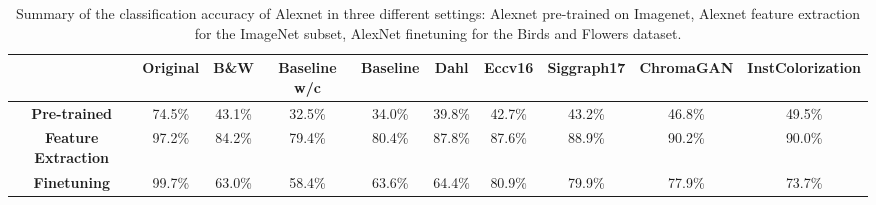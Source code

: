 \documentclass[10pt,twocolumn,letterpaper]{article}
\begin{document}
\begin{table}[ht]
	\begin{center}
		\begin{adjustwidth}{-1.3cm}{}
			\begin{tabular}{c|ccccccccc}
				&\textbf{Original} & \textbf{B\&W} & \textbf{Baseline w/c}&\textbf{Baseline} & \textbf{Dahl} & \textbf{Eccv16} & \textbf{Siggraph17} & \textbf{ChromaGAN} & \textbf{InstColorization}  \\
				\midrule
				\textbf{Pre-trained} & 74.5\% & 43.1\% & 32.5\% & 34.0\% & 39.8\% & 42.7\% & 43.2\% & 46.8\% & 49.5\% \\
				\midrule
				\textbf{Feature Extraction} & 97.2\% & 84.2\% & 79.4\% & 80.4\% & 87.8\% & 87.6\% &  88.9\%   &  90.2\% &       90.0\% \\
				\midrule
				\textbf{Finetuning} & 99.7\% & 63.0\% & 58.4\% & 63.6\% & 64.4\% & 80.9\% &  79.9\%   &  77.9\% &       73.7\% \\
			\end{tabular}
		\end{adjustwidth}
	\end{center}
	\caption{{\small  Summary of the classification accuracy of Alexnet in three different settings: Alexnet pre-trained on Imagenet, Alexnet feature extraction for the ImageNet subset, AlexNet finetuning for the Birds and Flowers dataset.}}
	\label{tab:pre-trained}
\end{table}
\end{document}
